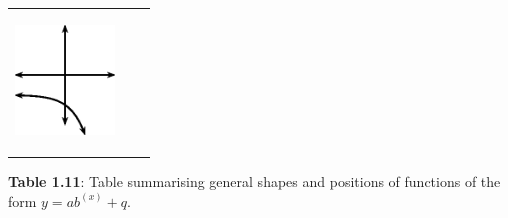 \begin{center}
\begin{xtabular*}{\mytablewidth}[t]{|p{10\mystarwidth}|p{10\mystarwidth}|p{10\mystarwidth}|}
        
                  
    \setcounter{subfigure}{0}

\label{m39348*id250608}
    \begin{center}
    \label{m39348*id250608!!!underscore!!!media}\label{m39348*id250608!!!underscore!!!printimage}\includegraphics[width=100px]{col11306.imgs/m39348_MG10C11_031.png} %
        
      \vspace{2pt}
    \vspace{.1in}
    
    \end{center}



    \addtocounter{footnote}{-0}
    
     \tabularnewline{}
    \end{xtabular*}
      \end{center}
    \begin{center}{\small\bfseries Table 1.11}: Table summarising general shapes and positions of functions of the form \begin{math}y=a{b}^{\left(x\right)}+q\end{math}.\end{center}
    
    \addtocounter{footnote}{-0}
    
    \par
        \label{m39348*uid187}
            \nopagebreak
            
